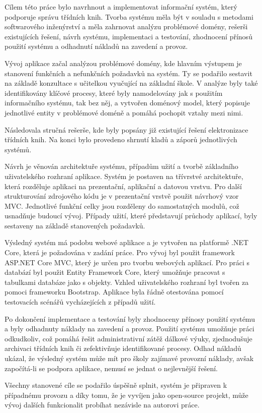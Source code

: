 \begin{conclusion}
Cílem této práce bylo navrhnout a implementovat informační systém, který podporuje správu třídních knih. Tvorba systému měla být v souladu s metodami softwarového inženýrství a měla zahrnovat analýzu problémové domény, rešerši existujících řešení, návrh systému, implementaci a testování, zhodnocení přínosů použití systému a odhadnutí nákladů na zavedení a provoz.

Vývoj aplikace začal analýzou problémové domény, kde hlavním výstupem je stanovení funkčních a nefunkčních požadavků na systém. Ty se podařilo sestavit na základě konzultace s učitelkou vyučující na základní škole. V analýze byly také identifikovány klíčové procesy, které byly namodelovány jak s použitím informačního systému, tak bez něj, a vytvořen doménový model, který popisuje jednotlivé entity v problémové doméně a pomáhá pochopit vztahy mezi nimi.

Následovala stručná rešerše, kde byly popsány již existující řešení elektronizace třídních knih. Na konci bylo provedeno shrnutí kladů a záporů jednotlivých systémů.

Návrh je věnován architektuře systému, případům užití a tvorbě základního uživatelského rozhraní aplikace. Systém je postaven na třívrstvé architektuře, která rozděluje aplikaci na prezentační, aplikační a datovou vrstvu. Pro další strukturování zdrojového kódu je v prezentační vrstvě použit návrhový vzor MVC. Jednotlivé funkční celky jsou rozděleny do samostatných modulů, což usnadňuje budoucí vývoj. Případy užití, které představují průchody aplikací, byly sestaveny na základě stanovených požadavků.

Výsledný systém má podobu webové aplikace a je vytvořen na platformě .NET Core, která je požadována v zadání práce. Pro vývoj byl použit framework ASP.NET Core MVC, který je určen pro tvorbu webových aplikací. Pro práci s databází byl použit Entity Framework Core, který umožňuje pracovat s tabulkami databáze jako s objekty. Vzhled uživatelského rozhraní byl tvořen za pomoci frameworku Bootstrap. Aplikace byla řádně otestována pomocí testovacích scénářů vycházejících z případů užití.
\newline

Po dokončení implementace a testování byly zhodnoceny přínosy použití systému a byly odhadnuty náklady na zavedení a provoz. Použití systému umožňuje práci odkudkoliv, což pomáhá řešit administrativní zátěž dálkové výuky, zjednodušuje archivaci třídních knih či zefektivňuje identifikované procesy. Odhad nákladů ukázal, že výsledný systém může mít pro školy zajímavé provozní náklady, avšak započítá-li se podpora aplikace, nemusí se jednat o nejlevnější řešení. 

Všechny stanovené cíle se podařilo úspěšně splnit, systém je připraven k případnému provozu a díky tomu, že je vyvíjen jako open-source projekt, může vývoj dalších funkcionalit probíhat nezávisle na autorovi práce.
\end{conclusion}
